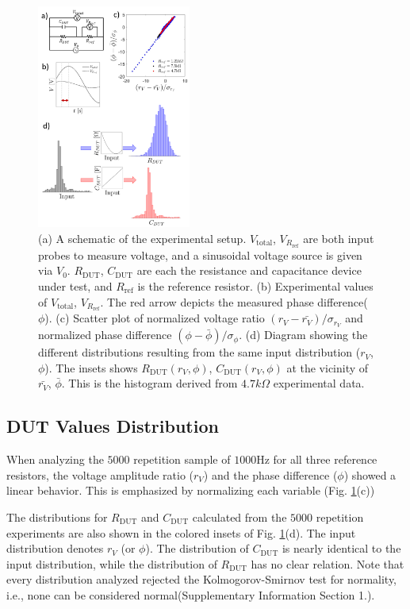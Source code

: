 \documentclass[%
 aip,
 amsmath,amssymb,
 reprint,%
]{revtex4-1}
\begin{document}
\begin{figure}
    \centering
    \includegraphics[width=0.45\textwidth]{./figures/basic.png}
    \caption{(a) A schematic of the experimental setup. $V_{\textrm{total}}$, $V_{R_{\textrm{ref}}}$ are both input probes to measure voltage, and a sinusoidal voltage source is given via $V_0$. $R_{\textrm{DUT}}$, $C_{\textrm{DUT}}$ are each the resistance and capacitance device under test, and $R_{\textrm{ref}}$ is the reference resistor. (b) Experimental values of $V_{\textrm{total}}$, $V_{R_{\textrm{ref}}}$. The red arrow depicts the measured phase difference($\phi$). (c) Scatter plot of normalized voltage ratio $(r_V-\bar{r_V})/\sigma_{r_V}$ and normalized phase difference $(\phi-\bar{\phi})/\sigma_{\phi}$. (d) Diagram showing the different distributions resulting from the same input distribution ($r_V$, $\phi$). The insets shows $R_{\textrm{DUT}}(r_V, \phi)$,  $C_{\textrm{DUT}}(r_V, \phi)$ at the vicinity of $\bar{r_V}$, $\bar{\phi}$. This is the histogram derived from $4.7k\Omega$ experimental data.}
    \label{fig:basic}
\end{figure}

\subsection{DUT Values Distribution}
When analyzing the $5000$ repetition sample of $1000$Hz for all three reference resistors, the voltage amplitude ratio ($r_V$) and the phase difference ($\phi$) showed a linear behavior. This is emphasized by normalizing each variable (Fig. \ref{fig:basic}(c)) 

The distributions for $R_{\textrm{DUT}}$ and $C_{\textrm{DUT}}$ calculated from the $5000$ repetition experiments are also shown in the colored insets of Fig. \ref{fig:basic}(d). The input distribution denotes $r_V$ (or $\phi$). The distribution of $C_{\textrm{DUT}}$ is nearly identical to the input distribution, while the distribution of $R_{\textrm{DUT}}$ has no clear relation. Note that every distribution analyzed rejected the Kolmogorov-Smirnov test for normality, i.e., none can be considered normal(Supplementary Information Section 1.).
\end{document}
